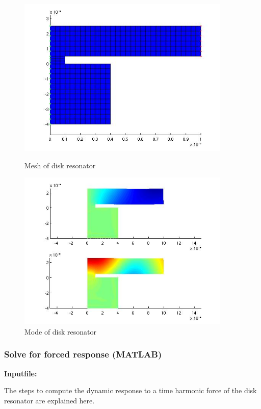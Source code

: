 \begin{figure}[htbp]
\centering
\includegraphics[height = 3in]{fig/disk_resonator_mesh.jpg}
\caption{Mesh of disk resonator}
\label{fig:DiskResonatorMesh}
\includegraphics[height = 3in]{fig/disk_resonator_mode.jpg}
\caption{Mode of disk resonator}
\label{fig:DiskResonatorMode}
\end{figure}

\clearpage
\subsubsection*{Solve for forced response (MATLAB)}
\begin{flushleft}
  \textbf{Inputfile:}
  \\
\end{flushleft}
\hspace{1in}
{\footnotesize
{}
}

\clearpage
The steps to compute the dynamic response to a time harmonic
force of the disk resonator are explained here. 

